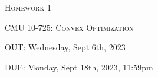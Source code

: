 \documentclass[12pt]{article}
\begin{document}
\section*{}
\begin{center}
  \centerline{\textsc{\LARGE  Homework 1}}
  \vspace{0.5em}
  \vspace{1em}
  \textsc{\large CMU 10-725: Convex Optimization} \\
  \vspace{0.5em}
  \vspace{0.5em}
  \centerline{OUT: Wednesday, Sept 6th, 2023}
  \vspace{0.5em}
  \centerline{DUE: Monday, Sept 18th, 2023, 11:59pm}
\end{center}
\end{document}
